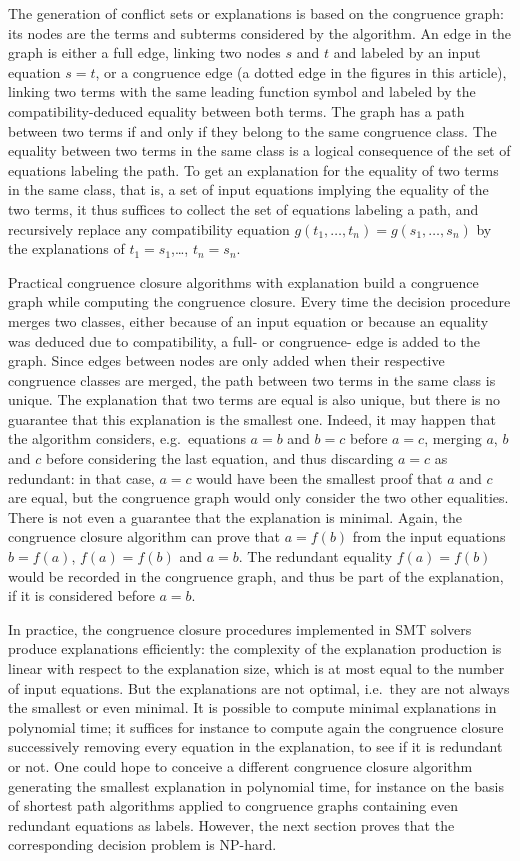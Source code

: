 \documentclass[smallextended]{svjour3}
\begin{document}
The generation of conflict sets or explanations is based on the congruence
graph: its nodes are the terms and subterms considered by the algorithm.  An
edge in the graph is either a full edge, linking two nodes $s$ and $t$ and
labeled by an input equation $s=t$, or a congruence edge (a dotted edge in the
figures in this article), linking two terms with the same leading function symbol
and labeled by the compatibility-deduced equality between both terms.  The graph
has a path between two terms if and only if they belong to the same congruence
class.  The equality between two terms in the same class is a logical consequence
of the set of equations labeling the path.  To get an explanation for the
equality of two terms in the same class, that is, a set of input equations
implying the equality of the two terms, it thus suffices to collect the set of
equations labeling a path, and recursively replace any compatibility equation
$g(t_1,\ldots,t_n) = g(s_1,\ldots,s_n)$ by the explanations of $t_1=s_1$,\dots,
$t_n=s_n$.

Practical congruence closure algorithms with explanation build a congruence
graph while computing the congruence closure.  Every time the decision procedure
merges two classes, either because of an input equation or because an equality was deduced due to compatibility,
a full- or congruence- edge is added to the graph.  
Since edges between nodes are only added when their respective congruence classes are merged, 
the path between two terms in the same class is unique.  The
explanation that two terms are equal is also unique, but there is no guarantee
that this explanation is the smallest one.  Indeed, it may happen that the
algorithm considers, e.g.\ equations $a=b$ and $b=c$ before $a=c$, merging $a$,
$b$ and $c$ before considering the last equation, and thus discarding $a=c$ as
redundant: in that case, $a=c$ would have been the smallest proof that $a$ and
$c$ are equal, but the congruence graph would only consider the two other
equalities. 
There is not even a guarantee that the explanation is minimal.
Again, the congruence closure algorithm can prove that $a = f(b)$ from the input
equations $b = f(a)$, $f(a) = f(b)$ and $a = b$.
The redundant equality $f(a) = f(b)$
would be recorded in the congruence graph, and thus be part of the explanation, if it is considered before $a = b$.

In practice, the congruence closure procedures implemented in SMT
solvers produce explanations efficiently: the
complexity of the explanation production is linear with respect to the
explanation size, which is at most equal to the number of input equations.  But
the explanations are not optimal, i.e.\ they are not always the smallest or even
minimal.  It is possible to compute minimal explanations in polynomial time; it
suffices for instance to compute again the congruence closure successively
removing every equation in the explanation, to see if it is redundant or not.
One could hope to conceive a different congruence closure algorithm generating
the smallest explanation in polynomial time, for instance on the basis of
shortest path algorithms applied to congruence graphs containing even redundant
equations as labels.  However, the next section proves that the corresponding decision problem
is NP-hard.
\end{document}
